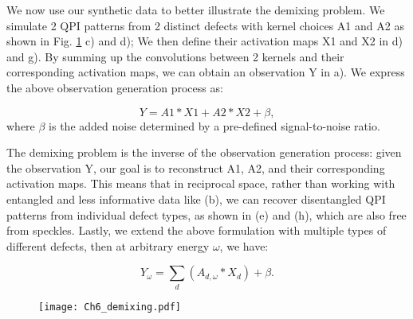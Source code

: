 We now use our synthetic data to better illustrate the demixing problem. We simulate 2 \ac{QPI} patterns from 2 distinct defects with kernel choices A1 and A2 as shown in Fig. \ref{fig:ch6_demix} c) and d); We then define their activation maps X1 and X2 in d) and g). By summing up the convolutions between 2 kernels and their corresponding activation maps, we can obtain an observation Y in a). We express the above observation generation process as:

\begin{equation}
	Y = A1 * X1 + A2 * X2 + \beta, 
\end{equation}
where $\beta$ is the added noise determined by a pre-defined signal-to-noise ratio.

The demixing problem is the inverse of the observation generation process: given the observation 
Y, our goal is to reconstruct A1, A2, and their corresponding activation maps. This means that in reciprocal space, rather than working with entangled and less informative data like (b), we can recover disentangled QPI patterns from individual defect types, as shown in (e) and (h), which are also free from speckles. Lastly, we extend the above formulation with multiple types of different defects, then at arbitrary energy $\omega$, we have: 

\begin{equation}
	\label{eq:demixing}
	Y_{\omega} = \sum_d ( A_{d,{\omega}} * X_d) + \beta. 
\end{equation} 

\begin{figure}
	\texttt{[image: Ch6\_demixing.pdf]} 
	\centering
	\caption{}
	\label{fig:ch6_demix}
\end{figure}


